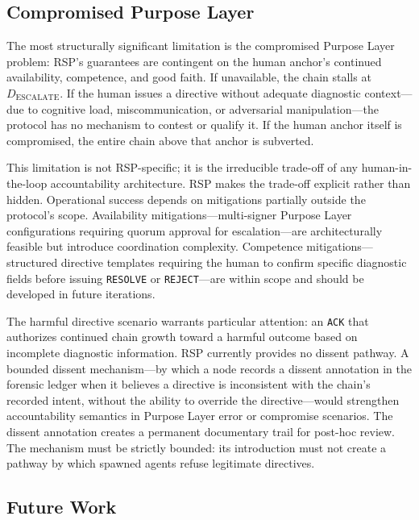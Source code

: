 \subsection{Compromised Purpose Layer}
\label{sec:rs-purpose-compromise}

The most structurally significant limitation is the compromised Purpose Layer problem: RSP's guarantees are contingent on the human anchor's continued availability, competence, and good faith. If unavailable, the chain stalls at $D_{\text{ESCALATE}}$. If the human issues a directive without adequate diagnostic context—due to cognitive load, miscommunication, or adversarial manipulation—the protocol has no mechanism to contest or qualify it. If the human anchor itself is compromised, the entire chain above that anchor is subverted.

This limitation is not RSP-specific; it is the irreducible trade-off of any human-in-the-loop accountability architecture. RSP makes the trade-off explicit rather than hidden. Operational success depends on mitigations partially outside the protocol's scope. Availability mitigations—multi-signer Purpose Layer configurations requiring quorum approval for escalation—are architecturally feasible but introduce coordination complexity. Competence mitigations—structured directive templates requiring the human to confirm specific diagnostic fields before issuing \texttt{RESOLVE} or \texttt{REJECT}—are within scope and should be developed in future iterations.

The harmful directive scenario warrants particular attention: an \texttt{ACK} that authorizes continued chain growth toward a harmful outcome based on incomplete diagnostic information. RSP currently provides no dissent pathway. A bounded dissent mechanism—by which a node records a dissent annotation in the forensic ledger when it believes a directive is inconsistent with the chain's recorded intent, without the ability to override the directive—would strengthen accountability semantics in Purpose Layer error or compromise scenarios. The dissent annotation creates a permanent documentary trail for post-hoc review. The mechanism must be strictly bounded: its introduction must not create a pathway by which spawned agents refuse legitimate directives.

\subsection{Future Work}
\label{sec:rs-future-work}

